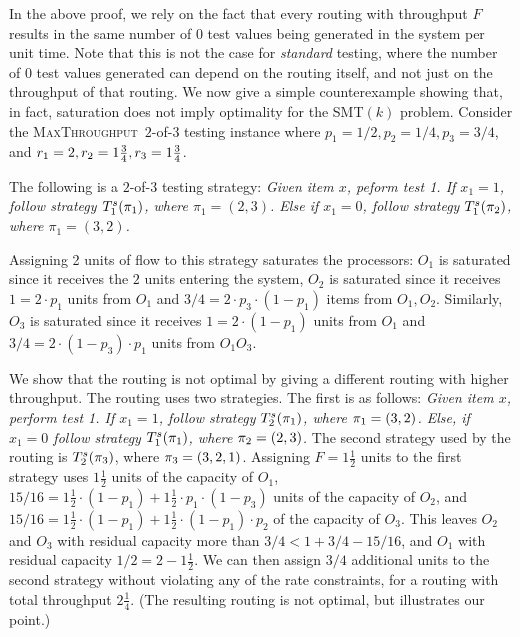 \documentclass{article}
\newcounter{ass}
\newcommand{\ens}[1]{\ensuremath{#1}}					\newcommand{\card}[1]{\ens{|#1|}}							\newcommand{\dotlist}[2]{\ens{#1,\ldots,#2}}
\newcommand{\anitem}{\ens{x}}
\newcommand{\valk}{\ens{k}}
\newcommand{\maxthru}{\textsc{MaxThroughput}}
\newcommand{\thruput}{\ens{F}}
\newcommand{\processor}{processor}
\newcommand{\smt}{\textsf{SMT}$(\valk)$ problem}				\newcommand{\cmt}{\textsf{CMT}$(\valk)$ problem}
\newcommand{\retval}[1]{\ens{\anitem_{#1}}}					\newcommand{\pr}[1]{\ens{p_{#1}}}									\newcommand{\qr}[1]{\ens{q_{#1}}}									\newcommand{\op}[1]{\ens{O_{#1}}}									\newcommand{\megaop}[1]{\ens{E_{#1}}}
\begin{document}
In the above proof, we rely on the fact that every routing with throughput $\thruput$
results in the same number of 0 test values being generated in the system per unit time.
Note that this is not the case for {\em standard} testing, where the number of 0 test
values generated can depend on the routing itself,
and not just on the throughput of that routing.
We now give a simple counterexample showing that, in fact, saturation does not  imply optimality for the \smt.
Consider the \maxthru\ $2$-of-$3$ testing instance where
$\pr{1}=1/2,\pr{2}=1/4,\pr{3}=3/4$, and $\rate{1}=2,\rate{2}=1\frac{3}{4},\rate{3}=1\frac{3}{4}$.  

The following is a $2$-of-$3$ testing strategy: 
{\em Given item $\anitem$, peform test 1. If $\retval{1}=1$, 
follow strategy $\sstrat{1}{\pi_1}$, where $\pi_1 = (2,3)$.
Else if $\retval{1}=0$, 
follow strategy $\sstrat{1}{\pi_2}$, where $\pi_1 = (3,2)$.}

Assigning 2 units of flow to this strategy saturates the {\processor}s: 
$\op{1}$ is saturated since it receives the $2$ units entering the system, $\op{2}$ is saturated since it receives 
$1=2\cdot\pr{1}$ units from $\op{1}$ and $3/4=2\cdot\pr{3}\cdot(1-\pr{1})$ items from $\op{1},\op{2}$.  
Similarly, $\op{3}$ is saturated since it receives $1=2\cdot(1-\pr{1})$ units from $\op{1}$ and 
$3/4=2\cdot(1-\pr{3})\cdot\pr{1}$ units from $\op{1}\op{3}$.

We show that the routing is not optimal by giving a different routing with higher throughput.
The routing uses two strategies.
The first is as follows: {\em Given item $\anitem$, perform test 1.
If $\retval{1}=1$, follow strategy $\sstrat{2}{\perm_1}$, where $\perm_1 = (3,2)$.
Else, if $\retval{1}=0$ 
follow strategy $\sstrat{1}{\perm_1}$, where $\perm_2 = (2,3)$.}
The second strategy used by
the routing is $\sstrat{2}{\perm_3}$, where
$\perm_3 = (3,2,1)$.
Assigning $\thruput=1\frac{1}{2}$ units to the first strategy uses
$1\frac{1}{2}$ units of the capacity of $\op{1}$,
$15/16=1\frac{1}{2}\cdot(1-\pr{1})+1\frac{1}{2}\cdot\pr{1}\cdot(1-\pr{3})$ units of the capacity of $\op{2}$, and $15/16=1\frac{1}{2}\cdot(1-\pr{1})+1\frac{1}{2}\cdot(1-\pr{1})\cdot\pr{2}$ of the capacity of $\op{3}$.
This leaves $\op{2}$ and $\op{3}$ with residual capacity more than
$3/4< 1+3/4-15/16$, and $\op{1}$ with residual capacity $1/2=2-1\frac{1}{2}$.
We can then assign $3/4$ additional units to the second strategy
without violating any of the rate constraints, for a routing with total throughput $2\frac{1}{4}$.
(The resulting routing is not optimal, but illustrates our point.)
\end{document}
